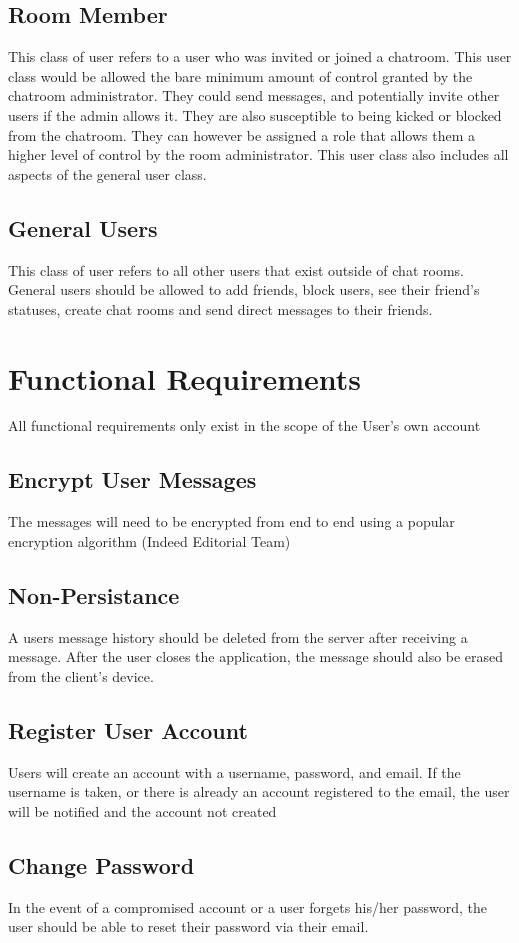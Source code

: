 \documentclass[11pt]{article}
\theoremstyle{plain}
\theoremstyle{definition}
\begin{document}
\subsection{Room Member}
This class of user refers to a user who was invited or joined a chatroom. This user class would be allowed the bare minimum amount of control granted by the chatroom administrator. They could send messages, and potentially invite other users if the admin allows it. They are also susceptible to being kicked or blocked from the chatroom. They can however be assigned a role that allows them a higher level of control by the room administrator.  This user class also includes all aspects of the general user class. 
\subsection{General Users}
This class of user refers to all other users that exist outside of chat rooms. General users should be allowed to add friends, block users, see their friend's statuses, create chat rooms and send direct messages to their friends.

\section{Functional Requirements}\label{sec:funcrequirements}
All functional requirements only exist in the scope of the User's own account
\subsection{Encrypt User Messages}
The messages will need to be encrypted from end to end using a popular encryption algorithm (Indeed Editorial Team)
\subsection{Non-Persistance}
A users message history should be deleted from the server after receiving a message. After the user closes the application, the message should also be erased from the client's device.
\subsection{Register User Account}
Users will create an account with a username, password, and email. If the username is taken, or there is already an account registered to the email, the user will be notified and the account not created
\subsection{Change Password}
In the event of a compromised account or a user forgets his/her password, the user should be able to reset their password via their email.
\end{document}
